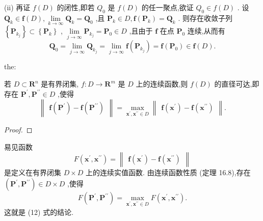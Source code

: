 (ii) 再证 \(f\left( D\right)\) 的闭性,即若 \({Q}_{0}\) 是 \(f\left( D\right)\) 的任一聚点,欲证 \({Q}_{0} \in  f\left( D\right)\) . 设 \({\mathbf{Q}}_{k} \in  \mathbf{f}\left( D\right) ,\mathop{\lim }\limits_{{k \rightarrow  \infty }}{\mathbf{Q}}_{k} = {\mathbf{Q}}_{0}\) ,且 \({\mathbf{P}}_{k} \in  D,\mathbf{f}\left( {\mathbf{P}}_{k}\right)  = {\mathbf{Q}}_{k}\) . 则存在收敛子列 \(\left\{  {\mathbf{P}}_{{k}_{j}}\right\}   \subset  \left\{  {\mathbf{P}}_{k}\right\}\) , \(\mathop{\lim }\limits_{{j \rightarrow  \infty }}{\mathbf{P}}_{{k}_{j}} = {\mathbf{P}}_{0} \in  D\) ,且由于 \(\mathbf{f}\) 在点 \({\mathbf{P}}_{0}\) 连续,从而有
\[
{\mathbf{Q}}_{0} = \mathop{\lim }\limits_{{j \rightarrow  \infty }}{\mathbf{Q}}_{{k}_{j}} = \mathop{\lim }\limits_{{j \rightarrow  \infty }}\mathbf{f}\left( {\mathbf{P}}_{{k}_{j}}\right)  = \mathbf{f}\left( {\mathbf{P}}_{0}\right)  \in  \mathbf{f}\left( D\right) .
\]
\begin{theorem}{}{the:}

\end{theorem}
 若 \(D \subset  {\mathbf{R}}^{n}\) 是有界闭集, \(f : D \rightarrow  {\mathbf{R}}^{m}\) 是 \(D\) 上的连续函数,则 \(f\left( D\right)\) 的直径可达,即存在 \({\mathbf{P}}^{\prime },{\mathbf{P}}^{\prime \prime } \in  D\) ,使得
\[
\begin{Vmatrix}{\mathbf{f}\left( {\mathbf{P}}^{\prime }\right)  - \mathbf{f}\left( {\mathbf{P}}^{\prime \prime }\right) }\end{Vmatrix} = \mathop{\max }\limits_{{{\mathbf{x}}^{\prime },{\mathbf{x}}^{\prime \prime } \in  D}}\begin{Vmatrix}{\mathbf{f}\left( {\mathbf{x}}^{\prime }\right)  - \mathbf{f}\left( {\mathbf{x}}^{\prime \prime }\right) }\end{Vmatrix}. \tag{12}
\]
\begin{proof}

\end{proof}
易见函数
\[
F\left( {{\mathbf{x}}^{\prime },{\mathbf{x}}^{\prime \prime }}\right)  = \begin{Vmatrix}{\mathbf{f}\left( {\mathbf{x}}^{\prime }\right)  - \mathbf{f}\left( {\mathbf{x}}^{\prime \prime }\right) }\end{Vmatrix}
\]
是定义在有界闭集 \(D \times  D\) 上的连续实值函数. 由连续函数性质 (定理 16.8),存在 \(\left( {{\mathbf{P}}^{\prime },{\mathbf{P}}^{\prime \prime }}\right)  \in  D \times  D\) ,使得
\[
F\left( {{\mathbf{P}}^{\prime },{\mathbf{P}}^{\prime \prime }}\right)  = \mathop{\max }\limits_{{{\mathbf{x}}^{\prime },{\mathbf{x}}^{\prime \prime } \in  D}}F\left( {{\mathbf{x}}^{\prime },{\mathbf{x}}^{\prime \prime }}\right) .
\]
这就是 (12) 式的结论.


